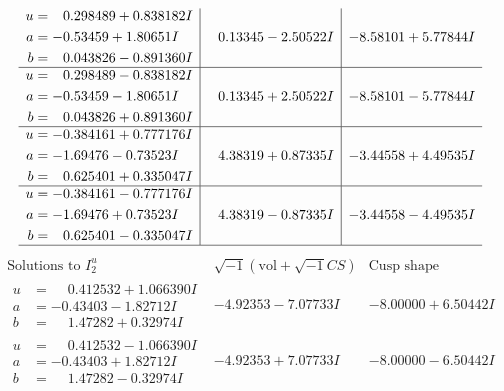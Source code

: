 \documentclass[1p]{elsarticle_modified}
\theoremstyle{definition}
\newcommand{\I}{\sqrt{-1}}
\begin{document}
$$\begin{array}{c|c|c}
\begin{aligned}
u &= \phantom{-}0.298489 + 0.838182 I \\
a &= -0.53459 + 1.80651 I \\
b &= \phantom{-}0.043826 - 0.891360 I\end{aligned}
 & \phantom{-}0.13345 - 2.50522 I & -8.58101 + 5.77844 I \\ \hline\begin{aligned}
u &= \phantom{-}0.298489 - 0.838182 I \\
a &= -0.53459 - 1.80651 I \\
b &= \phantom{-}0.043826 + 0.891360 I\end{aligned}
 & \phantom{-}0.13345 + 2.50522 I & -8.58101 - 5.77844 I \\ \hline\begin{aligned}
u &= -0.384161 + 0.777176 I \\
a &= -1.69476 - 0.73523 I \\
b &= \phantom{-}0.625401 + 0.335047 I\end{aligned}
 & \phantom{-}4.38319 + 0.87335 I & -3.44558 + 4.49535 I \\ \hline\begin{aligned}
u &= -0.384161 - 0.777176 I \\
a &= -1.69476 + 0.73523 I \\
b &= \phantom{-}0.625401 - 0.335047 I\end{aligned}
 & \phantom{-}4.38319 - 0.87335 I & -3.44558 - 4.49535 I\\
 \hline 
 \end{array}$$\newpage$$\begin{array}{c|c|c}  
\text{Solutions to }I^u_{2}& \I (\text{vol} + \sqrt{-1}CS) & \text{Cusp shape}\\
 \hline 
\begin{aligned}
u &= \phantom{-}0.412532 + 1.066390 I \\
a &= -0.43403 - 1.82712 I \\
b &= \phantom{-}1.47282 + 0.32974 I\end{aligned}
 & -4.92353 - 7.07733 I & -8.00000 + 6.50442 I \\ \hline\begin{aligned}
u &= \phantom{-}0.412532 - 1.066390 I \\
a &= -0.43403 + 1.82712 I \\
b &= \phantom{-}1.47282 - 0.32974 I\end{aligned}
 & -4.92353 + 7.07733 I & -8.00000 - 6.50442 I \\ \hline\begin{aligned}

\end{aligned}
\end{array}$$
\end{document}
